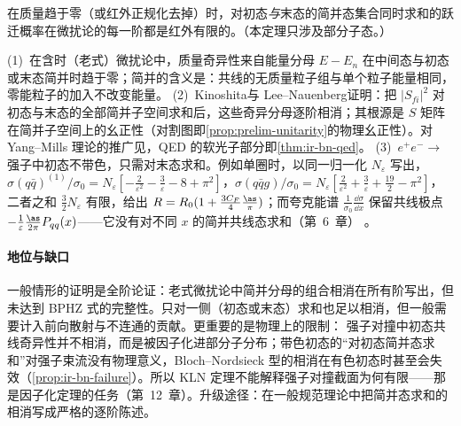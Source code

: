 \begin{theorem}\label{thm:ir-kln}
在质量趋于零（或红外正规化去掉）时，对初态\emph{与}末态的简并态集合同时求和的跃迁概率在微扰论的每一阶都是红外有限的。（本定理只涉及部分子态。）
\end{theorem}
\begin{proofsketch}
(1)~在含时（老式）微扰论中，质量奇异性来自能量分母 $E-E_n$ 在中间态与初态或末态简并时趋于零；简并的含义是：共线的无质量粒子组与单个粒子能量相同，零能粒子的加入不改变能量。
(2)~Kinoshita\cite{Kinoshita1962}与 Lee--Nauenberg\cite{LeeNauenberg1964}证明：把 $|S_{fi}|^2$ 对初态与末态的全部简并子空间求和后，这些奇异分母逐阶相消；其根源是 $S$ 矩阵在简并子空间上的幺正性（对割图即\cref{prop:prelim-unitarity}的物理幺正性）。对 Yang--Mills 理论的推广见\cite{Sterman:1976jh}，QED 的软光子部分即\cref{thm:ir-bn-qed}。
(3)~$e^+e^-\to$ 强子中初态不带色，只需对末态求和。例如单圈时，以同一归一化 $N_\varepsilon$ 写出，$\sigma(q\bar q)^{(1)}/\sigma_0=N_\varepsilon[-\frac2{\varepsilon^2}-\frac3\varepsilon-8+\pi^2]$，$\sigma(q\bar qg)/\sigma_0=N_\varepsilon[\frac2{\varepsilon^2}+\frac3\varepsilon+\frac{19}2-\pi^2]$，二者之和 $\frac32N_\varepsilon$ 有限，给出 $R=R_0(1+\frac{3C_F}4\frac{\as}\pi)$；而夸克能谱 $\frac1{\sigma_0}\frac{\dd\sigma}{\dd x}$ 保留共线极点 $-\frac1\varepsilon\frac{\as}{2\pi}P_{qq}(x)$——它没有对不同 $x$ 的简并共线态求和（第~6~章）%
。
\end{proofsketch}

\paragraph{地位与缺口}
一般情形的证明是全阶论证：老式微扰论中简并分母的组合相消在所有阶写出，但未达到 BPHZ 式的完整性。只对一侧（初态或末态）求和也足以相消，但一般需要计入前向散射与不连通的贡献\cite{Frye:2018xjj}。更重要的是物理上的限制：%
强子对撞中初态共线奇异性并不相消，而是被因子化进部分子分布；带色初态的“对初态简并态求和”对强子束流没有物理意义，Bloch--Nordsieck 型的相消在有色初态时甚至会失效（\cref{prop:ir-bn-failure}）。所以 KLN 定理不能解释强子对撞截面为何有限——那是因子化定理的任务（第~12~章）。升级途径：在一般规范理论中把简并态求和的相消写成严格的逐阶陈述。

